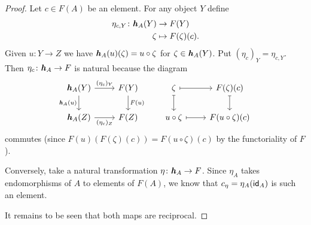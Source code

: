 \begin{proof}
    Let $c\in F(A)$ be an element. For any object $Y$ define
    \begin{align*}
        \eta_{c,Y}\colon \yoneda_A(Y)&\to F(Y)\\
        \zeta&\mapsto F(\zeta)(c).
    \end{align*}
    Given $u\colon Y\to Z$ we have $\textrm{\boldmath$\mathit h$}_A(u)(\zeta)=u\circ\zeta$ for $\zeta\in\textrm{\boldmath$\mathit h$}_A(Y)$. Put $(\eta_c)_Y=\eta_{c,Y}$. Then $\eta_c\colon\yoneda_A\to F$ is natural because the diagram
    $$
        \begin{tikzcd}
            \yoneda_A(Y)
                    \arrow[r,"(\eta_c)_Y"]
                    \arrow[d,"\yoneda_A(u)"']
                &F(Y)
                    \arrow[d,"F(u)"]
                &\zeta
                    \arrow[r,mapsto]
                    \arrow[d,mapsto]
                &F(\zeta)(c)
                    \arrow[d,mapsto]\\
            \yoneda_A(Z)
                    \arrow[r,"(\eta_c)_Z"']
                &F(Z)&u\circ\zeta
                    \arrow[r,mapsto]
                &F(u\circ\zeta)(c)
        \end{tikzcd}
    $$
    commutes (since $F(u)(F(\zeta)(c))=F(u\circ\zeta)(c)$ by the functoriality of $F$).
    
    Conversely, take a natural transformation $\eta\colon\yoneda_A\to F$. Since $\eta_A$ takes endomorphisms of $A$ to elements of $F(A)$, we know that $c_\eta=\eta_A(\mathsf{id}_A)$ is such an element.

    It remains to be seen that both maps are reciprocal.


\end{proof}
